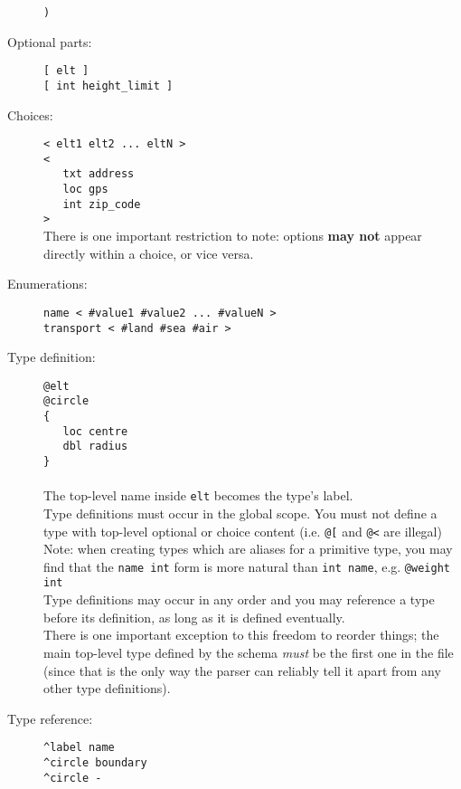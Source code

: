 \documentclass[12pt,a4paper,twoside]{article}
\renewcommand{\_}{\texttt{\symbol{95}}}
\begin{document}
\begin{description}
   \verb^)^\\
\item[Optional parts:]
	\verb^[ elt ]^\\
	\verb^[ int height_limit ]^
\item[Choices:]
	\verb^< elt1 elt2 ... eltN >^\\
   \verb^<^\\
   \verb^   txt address^\\
   \verb^   loc gps^\\
   \verb^   int zip_code^\\
   \verb^>^\\
	There is one important restriction to note: options \textbf{may not}
	appear directly within a choice, or vice versa.
\item[Enumerations:]
	\verb^name < #value1 #value2 ... #valueN >^\\
	\verb^transport < #land #sea #air >^
\item[Type definition:]
	\verb^@elt^\\
   \verb^@circle^\\
   \verb^{^\\
   \verb^   loc centre^\\
   \verb^   dbl radius^\\
   \verb^}^\\
	\\
	The top-level name inside \verb^elt^ becomes the type's label.\\
	Type definitions must occur in the global scope.
	You must not define a type with top-level optional or choice
	content (i.e. \verb^@[^ and \verb^@<^ are illegal)\\
	Note: when creating types which are aliases for a primitive type,
	you may find that the \verb^name int^ form is more natural than
	\verb^int name^, e.g. \verb^@weight int^\\
	Type definitions may occur in any order and you may reference a
	type before its definition, as long as it is defined eventually.\\
	There is one important exception to this freedom to reorder things;
	the main top-level type defined by the schema \textit{must} be the
	first one in the file (since that is the only way the parser can
	reliably tell it apart from any other type definitions).
\item[Type reference:]
	\verb&^label name&\\
	\verb&^circle boundary&\\
	\verb&^circle -&\\

\end{description}
\end{document}
